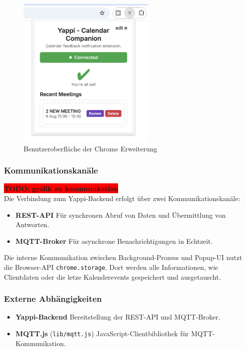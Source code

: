 \documentclass[12pt,a4paper]{report}
\newcommand{\todo}[1]{\colorbox{red}{\textbf{TODO: #1}}\\}
\begin{document}
            \begin{figure}[H]
              \centering
              \includegraphics[width=0.60\textwidth]{../figures/yappi-chrome-extension/yappi-extension-popup.jpg}
              \caption{Benutzeroberfläche der Chrome Erweiterung}
              \label{fig:yappi-extension-popup}
            \end{figure}


    \subsubsection{Kommunikationskanäle}
      \todo{grafik zu kommunikation}
        Die Verbindung zum Yappi-Backend erfolgt über zwei Kommunikationskanäle:
        \begin{itemize}
          \item \textbf{REST-API} Für synchronen Abruf von Daten und Übermittlung von Antworten.
          \item \textbf{MQTT-Broker} Für asynchrone Benachrichtigungen in Echtzeit.
        \end{itemize}

        Die interne Kommunikation zwischen Background-Prozess und Popup-UI nutzt die Browser-API \texttt{chrome.storage}.
        Dort werden alle Informationen, wie Clientdaten oder die letze Kalenderevents gespeichert und ausgetauscht.



    \subsubsection{Externe Abhängigkeiten}
        \begin{itemize}
          \item \textbf{Yappi-Backend} Bereitstellung der REST-API und MQTT-Broker.
          \item \textbf{MQTT.js} (\texttt{lib/mqtt.js}) JavaScript-Clientbibliothek für MQTT-Kommunikation.
        \end{itemize}
\end{document}
